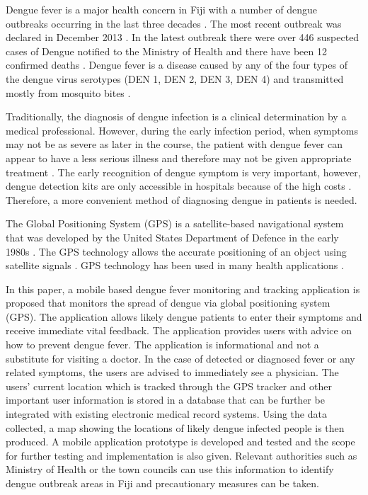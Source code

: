 \documentclass[runningheads,a4paper]{llncs}
\begin{document}
Dengue fever is a major health concern in Fiji with a number of dengue outbreaks occurring in the last three decades  \cite{Tabua2013}. The most recent outbreak was declared in December 2013 \cite{Vuibau2013}. In the latest outbreak there were over 446 suspected cases of Dengue notified to the Ministry of Health and there have been 12 confirmed deaths \cite{Nand2014}. Dengue fever is a disease caused by any of the four types of the dengue virus serotypes (DEN 1, DEN 2, DEN 3, DEN 4) \cite{WHO2009} and transmitted mostly from mosquito bites \cite{Muller201290}.  

Traditionally, the diagnosis of dengue infection is a clinical determination by a medical professional. However, during the early infection period, when symptoms may not be as severe as later in the course, the patient with dengue fever can appear to have a less serious illness and therefore may not be given appropriate treatment \cite {Matthews:2012}. The early recognition of dengue symptom is very important, however, dengue detection kits are only accessible in hospitals because of the high costs \cite{Mitra2014450}. Therefore, a more convenient method of diagnosing dengue in patients is needed.



The Global Positioning System (GPS) is a satellite-based navigational system that was developed by the United States  Department of Defence in the early 1980s \cite{Wang2013202}. The GPS technology allows the accurate positioning of an object using satellite signals \cite{Mintsis2004399}. GPS technology has been  used in many health applications \cite{Kerr2011} \cite{Rainham2008} \cite{Boulos2011} \cite{Chaix2013} .

In this paper, a mobile based dengue fever monitoring and tracking application is proposed that monitors the spread of dengue via global positioning system (GPS). The application allows likely dengue patients to enter their symptoms and receive immediate vital feedback. The application provides users with advice on how to prevent dengue fever. The application is informational and not a substitute for visiting a doctor.  In the case of detected or diagnosed  fever or any related symptoms, the users are advised to immediately see a physician. The users’ current location which is tracked through the GPS tracker and other important user information is stored in a database that can be further be integrated with existing electronic medical record systems. Using the data collected, a map showing the locations of likely dengue infected people is then produced.  A mobile application prototype is developed and tested and the scope for further testing and implementation is also given. Relevant authorities such as Ministry of Health or the town councils can   use this information to identify dengue outbreak areas in Fiji and precautionary measures can be taken.
\end{document}
